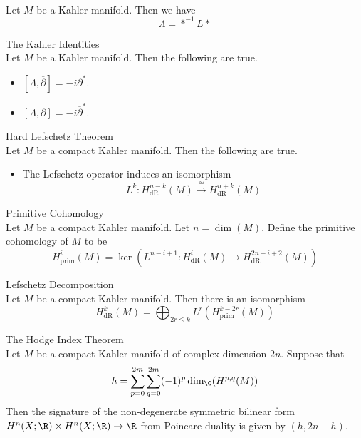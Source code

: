 \documentclass[a4paper]{article}
\begin{document}
\begin{lmm}{}{}\\
Let $M$ be a Kahler manifold. Then we have $$\Lambda=\ast^{-1}L\ast$$
\end{lmm}

\begin{prp}{The Kahler Identities}{}\\
Let $M$ be a Kahler manifold. Then the following are true. 
\begin{itemize}
\item $[\Lambda,\overline{\partial}]=-i\partial^\ast$. 
\item $[\Lambda,\partial]=-i\overline{\partial}^\ast$. 
\end{itemize}
\end{prp}

\begin{thm}{Hard Lefschetz Theorem}{}\\
Let $M$ be a compact Kahler manifold. Then the following are true. 
\begin{itemize}
\item The Lefschetz operator induces an isomorphism $$L^k:H_\text{dR}^{n-k}(M)\overset{\cong}{\longrightarrow} H_\text{dR}^{n+k}(M)$$
\end{itemize}
\end{thm}

\begin{defn}{Primitive Cohomology}{}\\
Let $M$ be a compact Kahler manifold. Let $n=\dim(M)$. Define the primitive cohomology of $M$ to be $$H_\text{prim}^i(M)=\ker(L^{n-i+1}:H_\text{dR}^i(M)\to H_\text{dR}^{2n-i+2}(M))$$
\end{defn}

\begin{prp}{Lefschetz Decomposition}{}\\
Let $M$ be a compact Kahler manifold. Then there is an isomorphism $$H_\text{dR}^k(M)=\bigoplus_{2r\leq k} L^r(H_\text{prim}^{k-2r}(M))$$
\end{prp}

\begin{thm}{The Hodge Index Theorem}{}\\
Let $M$ be a compact Kahler manifold of complex dimension $2n$. Suppose that $$h=\sum_{p=0}^{2m}\sum_{q=0}^{2m}(-1)^p\dim_\C(H^{p,q}(M))$$Then the signature of the non-degenerate symmetric bilinear form $H^n(X;\R)\times H^n(X;\R)\to\R$ from Poincare duality is given by $(h,2n-h)$. 
\end{thm}
\end{document}

